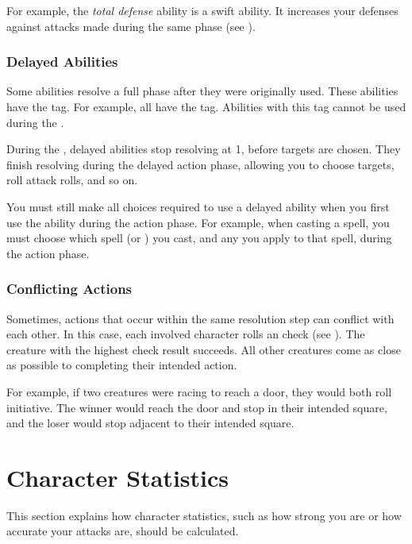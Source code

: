             For example, the \textit{total defense} ability is a swift ability.
            It increases your defenses against attacks made during the same phase (see ).

        \subsubsection{Delayed Abilities}\label{Delayed Abilities}
            Some abilities resolve a full phase after they were originally used.
            These abilities have the  tag.
            For example, all  have the  tag.
            Abilities with this tag cannot be used during the .

            During the , delayed abilities stop resolving at  1, before targets are chosen.
            They finish resolving during the delayed action phase, allowing you to choose targets, roll attack rolls, and so on.

            You must still make all choices required to use a delayed ability when you first use the ability during the action phase.
            For example, when casting a spell, you must choose which spell (or ) you cast, and any  you apply to that spell, during the action phase.

        \subsubsection{Conflicting Actions}\label{Conflicting Actions}

            Sometimes, actions that occur within the same resolution step can conflict with each other.
            In this case, each involved character rolls an  check (see ).
            The creature with the highest check result succeeds.
            All other creatures come as close as possible to completing their intended action.

            For example, if two creatures were racing to reach a door, they would both roll initiative.
            The winner would reach the door and stop in their intended square, and the loser would stop adjacent to their intended square.

\section{Character Statistics}
    This section explains how character statistics, such as how strong you are or how accurate your attacks are, should be calculated.

